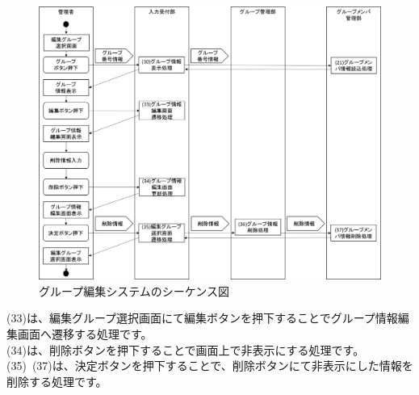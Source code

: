 \begin{figure}[htbp]
  \begin{center}
    \includegraphics[width=1\linewidth,clip]{./img/seq9.png}
    \caption{グループ編集システムのシーケンス図}\label{fig:seq9}
  \end{center}
\end{figure}

(33)は、編集グループ選択画面にて編集ボタンを押下することでグループ情報編集画面へ遷移する処理です。\\
(34)は、削除ボタンを押下することで画面上で非表示にする処理です。\\
(35)~(37)は、決定ボタンを押下することで、削除ボタンにて非表示にした情報を削除する処理です。


